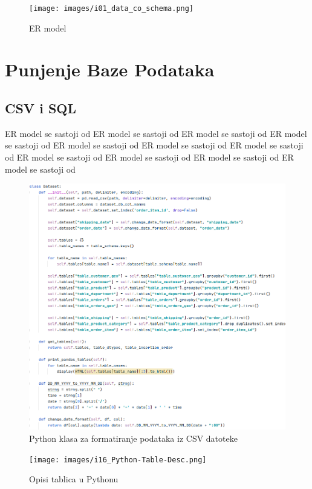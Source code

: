 \documentclass[12pt, oneside]{book}
\begin{document}
\begin{figure}[h]
\texttt{[image: images/i01\_data\_co\_schema.png]}
\centering
\caption{ER model}
\end{figure}

\vspace{5cm}

\section{Punjenje Baze Podataka}



\subsection{CSV i SQL}
ER model se sastoji od ER model se sastoji od ER model se sastoji od ER model se sastoji od ER model se sastoji od ER model se sastoji od ER model se sastoji od ER model se sastoji od ER model se sastoji od ER model se sastoji od ER model se sastoji od 

\begin{figure}[h]
\includegraphics[width=14cm]{images/i15_Python-Table-Clean.png}
\centering
\caption{Python klasa za formatiranje podataka iz CSV datoteke}
\end{figure}



\begin{figure}[h]
\texttt{[image: images/i16\_Python-Table-Desc.png]}
\centering
\caption{Opisi tablica u Pythonu}
\end{figure}
\end{document}

